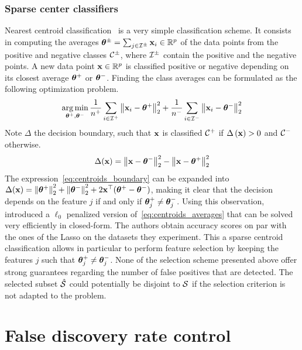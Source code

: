 \subsubsection{Sparse center classifiers}

Nearest centroid classification~\cite{centroid_classification} is a very simple classification scheme.
It consists in computing the averages $\bm{\theta}^\pm = \sum_{j \in \mathcal{I}^\pm} \mathbf{x}_i \in \mathbb{R}^p$
of the data points from the positive and negative classes $\mathcal{C}^\pm$,
where $\mathcal{I}^\pm$ contain the positive and the negative points.
A new data point $\mathbf{x} \in \mathbb{R}^p$ is classified positive or negative depending on its closest average
$\bm{\theta}^+$ or $\bm{\theta}^-$.
Finding the class averages can be formulated as the following optimization problem.
\begin{equation}\label{eq:centroids_averages}
    \operatorname*{arg\,min}_{\bm{\theta}^+, \bm{\theta}^-}
        \frac{1}{n^+} \sum_{i \in \mathcal{I}^+} \big\lVert \mathbf{x}_i - \bm{\theta}^+ \big\rVert^2_2
        + \frac{1}{n^-} \sum_{i \in \mathcal{I}^-} \big\lVert \mathbf{x}_i - \bm{\theta}^- \big\rVert^2_2
\end{equation}
Note $\Delta$ the decision boundary,
such that $\mathbf{x}$ is classified $\mathcal{C}^+$ if $\Delta\left( \mathbf{x} \right) > 0$ and $\mathcal{C}^-$ otherwise.
\begin{equation}\label{eq:centroids_boundary}
    \Delta(\mathbf{x}) = \left\lVert\mathbf{x} - \bm{\theta}^-\right\rVert^2_2 - \left\lVert\mathbf{x} - \bm{\theta}^+\right\rVert^2_2
\end{equation}
The expression~\ref{eq:centroids_boundary} can be expanded into
$\Delta(\mathbf{x}) = \left\lVert\bm{\theta}^+\right\rVert^2_2 + \left\lVert\bm{\theta}^-\right\rVert^2_2 + 2\mathbf{x}^\top(\bm{\theta}^+ - \bm{\theta}^-)$,
making it clear that the decision depends on the feature $j$ if and only if $\bm{\theta}^+_j \neq \bm{\theta}^-_j$.
Using this observation,\cite{sparse_center_classifiers} introduced a $\ell_0$ penalized version
of~\ref{eq:centroids_averages} that can be solved very efficiently in closed-form.
The authors obtain accuracy scores on par with the ones of the Lasso on the datasets they experiment.
This a sparse centroid classification allows in particular to perform feature selection
by keeping the features $j$ such that $\bm{\theta}^+_j \neq \bm{\theta}^-_j$.
%
\bigbreak
None of the selection scheme presented above offer strong guarantees regarding
the number of false positives that are detected.
The selected subset $\hat{\mathcal{S}}$ could potentially be disjoint to $\mathcal{S}$
if the selection criterion is not adapted to the problem.

\section{False discovery rate control}\label{sec:fdrc}

